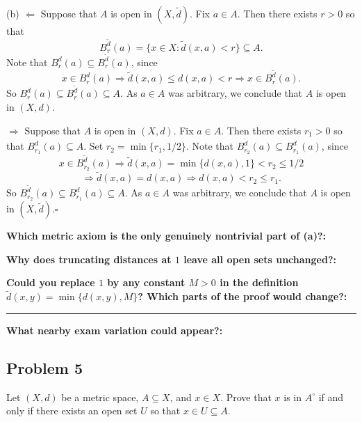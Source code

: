 \documentclass[12pt]{article}
\newcommand{\fillfield}[1]{%
  \par\noindent\textbf{#1:}\enspace\hrulefill\par\vspace{3pt}%
}
\newcommand{\fillfieldlong}[1]{%
  \par\noindent\textbf{#1:}\par\vspace{1.5cm}%
  \noindent\rule{\linewidth}{0.35pt}\par\vspace{4pt}%
}
\begin{document}
\begin{tcolorbox}[
  enhanced, breakable,
  colback  = solgreen,
  colframe = green!45!black,
  fonttitle = \bfseries,
  title = {\textsc{Official Solution}\hfill Homework 8 -- Selected Solutions}
]
\medskip
(b) $\Longleftarrow$ Suppose that $A$ is open in $(X, \tilde{d})$. Fix $a \in A$. Then there exists $r > 0$ so that
\[
  B_r^{\tilde{d}}(a) = \{x \in X : \tilde{d}(x, a) < r\} \subseteq A.
\]
Note that $B_r^d(a) \subseteq B_r^{\tilde{d}}(a)$, since
\[
  x \in B_r^d(a) \Longrightarrow \tilde{d}(x, a) \le d(x, a) < r \Longrightarrow x \in B_r^{\tilde{d}}(a).
\]
So $B_r^d(a) \subseteq B_r^{\tilde{d}}(a) \subseteq A$. As $a \in A$ was arbitrary, we conclude that $A$
is open in $(X, d)$.

\medskip
$\Longrightarrow$ Suppose that $A$ is open in $(X, d)$. Fix $a \in A$. Then there exists $r_1 > 0$ so that
$B_{r_1}^d(a) \subseteq A$. Set $r_2 = \min\{r_1, 1/2\}$. Note that $B_{r_2}^{\tilde{d}}(a) \subseteq B_{r_1}^d(a)$, since
\[
  x \in B_{r_2}^{\tilde{d}}(a) \Longrightarrow \tilde{d}(x, a) = \min\{d(x, a), 1\} < r_2 \le 1/2
\]
\[
  \Longrightarrow \tilde{d}(x, a) = d(x, a) \Longrightarrow d(x, a) < r_2 \le r_1.
\]
So $B_{r_2}^{\tilde{d}}(a) \subseteq B_{r_1}^d(a) \subseteq A$. As $a \in A$ was arbitrary, we conclude that
$A$ is open in $(X, \tilde{d})$.\hfill$\square$
\end{tcolorbox}

\bigskip

\begin{tcolorbox}[
  enhanced, breakable,
  colback  = reflectcyan,
  colframe = cyan!55!black,
  fonttitle = \bfseries,
  title = {\textsc{Reflection \& Variation}}
]
\fillfield{Which metric axiom is the only genuinely nontrivial part of (a)?}
\fillfield{Why does truncating distances at $1$ leave all open sets unchanged?}
\fillfieldlong{Could you replace $1$ by any constant $M>0$ in the definition $\tilde d(x,y)=\min\{d(x,y),M\}$? Which parts of the proof would change?}
\fillfield{What nearby exam variation could appear?}
\end{tcolorbox}

\newpage
\subsection{Problem 5}

\begin{tcolorbox}[
  enhanced, breakable,
  colback  = probblue,
  colframe = blue!55!black,
  fonttitle = \bfseries,
  title = {\textsc{Problem Statement}\hfill Homework 8, Problem 5}
]
Let $(X, d)$ be a metric space, $A \subseteq X$, and $x \in X$. Prove that $x$ is in $A^\circ$ if and
only if there exists an open set $U$ so that $x \in U \subseteq A$.
\end{tcolorbox}
\end{document}
